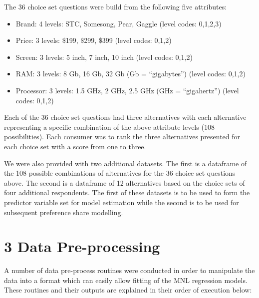 \documentclass[]{article}
\providecommand{\tightlist}{%
  \setlength{\itemsep}{0pt}\setlength{\parskip}{0pt}}
\begin{document}
The 36 choice set questions were build from the following five
attributes:

\begin{itemize}
\tightlist
\item
  Brand: 4 levels: STC, Somesong, Pear, Gaggle (level codes: 0,1,2,3)
\item
  Price: 3 levels: \$199, \$299, \$399 (level codes: 0,1,2)
\item
  Screen: 3 levels: 5 inch, 7 inch, 10 inch (level codes: 0,1,2)
\item
  RAM: 3 levels: 8 Gb, 16 Gb, 32 Gb (Gb = ``gigabytes'') (level codes:
  0,1,2)
\item
  Processor: 3 levels: 1.5 GHz, 2 GHz, 2.5 GHz (GHz = ``gigahertz'')
  (level codes: 0,1,2)
\end{itemize}

Each of the 36 choice set questions had three alternatives with each
alternative representing a specific combination of the above attribute
levels (108 possibilities). Each consumer was to rank the three
alternatives presented for each choice set with a score from one to
three.

We were also provided with two additional datasets. The first is a
dataframe of the 108 possible combinations of alternatives for the 36
choice set questions above. The second is a dataframe of 12 alternatives
based on the choice sets of four additional respondents. The first of
these datasets is to be used to form the predictor variable set for
model estimation while the second is to be used for subsequent
preference share modelling.

\section{3 Data Pre-processing}\label{data-pre-processing}

A number of data pre-process routines were conducted in order to
manipulate the data into a format which can easily allow fitting of the
MNL regression models. These routines and their outputs are explained in
their order of execution below:
\end{document}
